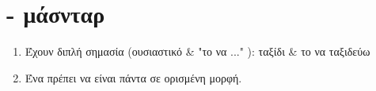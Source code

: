 \section*{ - μάσνταρ}
\begin{enumerate}
\item Έχουν διπλή σημασία (ουσιαστικό \& "το να ..." ):  ταξίδι \& το να ταξιδεύω
\item Ένα  πρέπει να είναι πάντα σε ορισμένη μορφή.
\end{enumerate}
